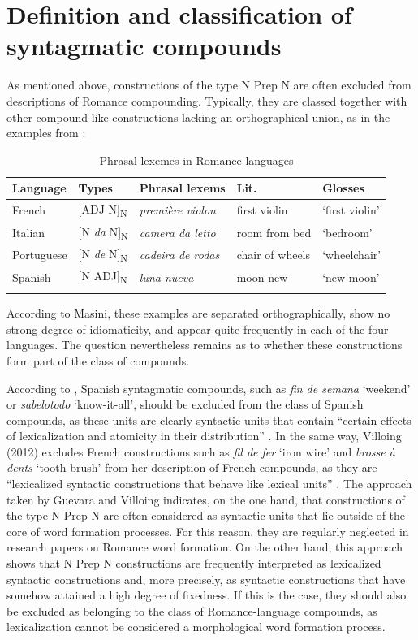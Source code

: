 \documentclass[output=paper]{langsci/langscibook}
\begin{document}
\section{Definition and classification of syntagmatic compounds} 

As mentioned above, constructions of the type N Prep N are often excluded from descriptions of Romance compounding.  Typically, they are classed together with other compound-like constructions lacking an orthographical union, as in the examples from \citep[257]{Masini:2009}: 

\begin{table}
\caption{Phrasal lexemes in Romance languages }
\label{Fig:1:Types of phrasal lexemes}
\begin{tabular}{lllll}
\lsptoprule 
Language & Types & Phrasal lexems & Lit. & Glosses\\ 
\midrule
French & [ADJ N]\textsubscript{N} & \textit{première violon} & first violin & `first violin' \\  
Italian & [N \textit{da} N]\textsubscript{N} & \textit{camera da letto} & room from bed & `bedroom' \\  
Portuguese & [N \textit{de} N]\textsubscript{N} & \textit{cadeira de rodas} & chair of wheels & `wheelchair' \\  
Spanish & [N ADJ]\textsubscript{N} & \textit{luna nueva} & moon new & `new moon' \\ 
\lspbottomrule
\end{tabular} 
\end{table}

According to Masini, these examples are separated orthographically, show no strong degree of idiomaticity, and appear quite frequently in each of the four languages. The question nevertheless remains as to whether these constructions form part of the class of compounds.

According to \citet{Guevara:2012}, Spanish syntagmatic compounds, such as \textit{fin de semana} `weekend' or \textit{sabelotodo} `know-it-all', should be excluded from the class of Spanish compounds, as these units are clearly syntactic units that contain “certain effects of lexicalization and atomicity in their distribution” \citep[180]{Guevara:2012}. In the same way, Villoing (2012) excludes French constructions such as \textit {fil de fer} `iron wire' and \textit {brosse à dents} `tooth brush' from her description of French compounds, as they are “lexicalized syntactic constructions that behave like lexical units” \citep[35]{Villoing:2012}. The approach taken by Guevara and Villoing indicates, on the one hand, that constructions of the type N Prep N are often considered as syntactic units that lie outside of the core of word formation processes. For this reason, they are regularly neglected in research papers on Romance word formation. On the other hand, this approach shows that N Prep N constructions are frequently interpreted as lexicalized syntactic constructions and, more precisely, as syntactic constructions that have somehow attained a high degree of fixedness. If this is the case, they should also be excluded as belonging to the class of Romance-language compounds, as lexicalization cannot be considered a morphological word formation process.
\end{document}
